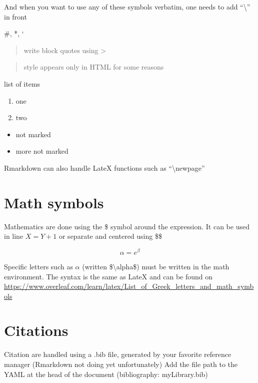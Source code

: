 \documentclass[
  11pt,
]{article}
\begin{document}
And when you want to use any of these symbols verbatim, one needs to add ``\textbackslash{}'' in front

\#, *, `

\begin{quote}
write block quotes using \textgreater{}
\end{quote}

\begin{quote}
style appears only in HTML for some reasons
\end{quote}

list of items

\begin{enumerate}
\def\labelenumi{\arabic{enumi}.}
\item
  one
\item
  two
\end{enumerate}

\begin{itemize}
\item
  not marked
\item
  more not marked
\end{itemize}

Rmarkdown can also handle LateX functions such as ``\textbackslash newpage''

\newpage

\hypertarget{math-symbols}{%
\section{Math symbols}\label{math-symbols}}

Mathematics are done using the \$ symbol around the expression. It can be used in line \(X = Y + 1\) or separate and centered using \$\$

\[\alpha = e{^\beta}\]

Specific letters such as \(\alpha\) (written \$\textbackslash alpha\$) must be written in the math environment. The syntax is the same as LateX and can be found on \url{https://www.overleaf.com/learn/latex/List_of_Greek_letters_and_math_symbols}

\hypertarget{citations}{%
\section{Citations}\label{citations}}

Citation are handled using a .bib file, generated by your favorite reference manager (Rmarkdown not doing yet unfortunately)
Add the file path to the YAML at the head of the document (bibliography: myLibrary.bib)
\end{document}
